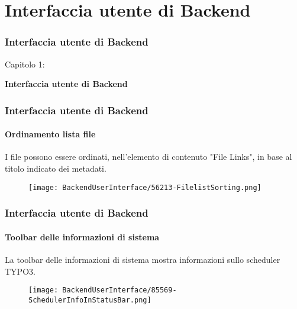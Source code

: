 %

\section{Interfaccia utente di Backend}
\begin{frame}[fragile]
	\frametitle{Interfaccia utente di Backend}

	\begin{center}\huge{Capitolo 1:}\end{center}
	\begin{center}\huge{\color{typo3darkgrey}\textbf{Interfaccia utente di Backend}}\end{center}

\end{frame}


\begin{frame}[fragile]
	\frametitle{Interfaccia utente di Backend}
	\framesubtitle{Ordinamento lista file}

	I file possono essere ordinati, nell'elemento di contenuto "File Links", in base al titolo indicato dei metadati.

	\begin{figure}
		\texttt{[image: BackendUserInterface/56213-FilelistSorting.png]}
	\end{figure}

\end{frame}


\begin{frame}[fragile]
	\frametitle{Interfaccia utente di Backend}
	\framesubtitle{Toolbar delle informazioni di sistema}

	La toolbar delle informazioni di sistema mostra informazioni sullo scheduler TYPO3.

	\begin{figure}
		\texttt{[image: BackendUserInterface/85569-SchedulerInfoInStatusBar.png]}
	\end{figure}

\end{frame}

